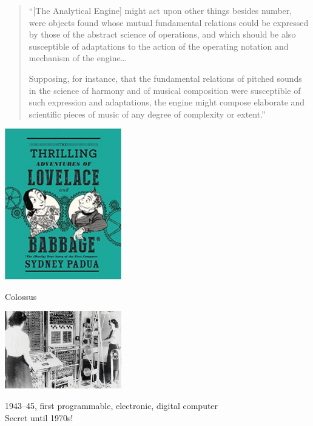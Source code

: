 \documentclass[xcolor={usenames,dvipsnames,svgnames,table},12pt]{beamer}
\begin{document}
\begin{frame}{}
  \begin{quote}
    ``[The Analytical Engine] might act upon other things besides number,
    were objects found whose mutual fundamental relations could be
    expressed by those of the abstract science of operations, and which
    should be also susceptible of adaptations to the action of the
    operating notation and mechanism of the engine\dots \medskip

    Supposing, for instance, that the fundamental relations of pitched
    sounds in the science of harmony and of musical composition were
    susceptible of such expression and adaptations, the engine might
    compose elaborate and scientific pieces of music of any degree of
    complexity or extent.''
  \end{quote}
\end{frame}

\begin{frame}{}
  \begin{center}
    \includegraphics[width=2in]{adventures}
  \end{center}
\end{frame}

\begin{frame}{Colossus}
  \begin{center}
    \includegraphics[width=2in]{Colossus}

    1943--45, first programmable, electronic, digital computer \\
    Secret until 1970s!
  \end{center}
\end{frame}
\end{document}
